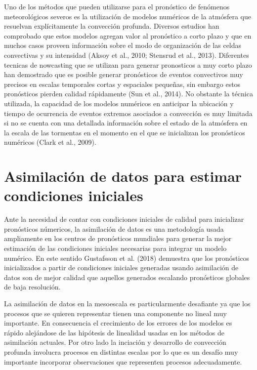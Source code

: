 \documentclass[12pt,oneside]{reedthesis}
\begin{document}
Uno de los métodos que pueden utilizarse para el pronóstico de fenómenos meteorológicos severos es la utilización de modelos numéricos de la atmósfera que resuelvan explícitamente la convección profunda. Diversos estudios han comprobado que estos modelos agregan valor al pronóstico a corto plazo y que en muchos casos proveen información sobre el modo de organización de las celdas convectivas y su intensidad (Aksoy et al., 2010; Stensrud et al., 2013). Diferentes tecnicas de nowcasting que se utilizan para generar pronosticos a muy corto plazo han demostrado que es posible generar pronósticos de eventos convectivos muy precisos en escalas temporales cortas y espaciales pequeñas, sin embargo estos pronósticos pierden calidad rápidamente (Sun et al., 2014). No obstante la técnica utilizada, la capacidad de los modelos numéricos en anticipar la ubicación y tiempo de ocurrencia de eventos extremos asociados a convección es muy limitada si no se cuenta con una detallada información sobre el estado de la atmósfera en la escala de las tormentas en el momento en el que se inicializan los pronósticos numéricos (Clark et al., 2009).

\hypertarget{asimilaciuxf3n-de-datos-para-estimar-condiciones-iniciales}{%
\section{Asimilación de datos para estimar condiciones iniciales}\label{asimilaciuxf3n-de-datos-para-estimar-condiciones-iniciales}}

Ante la necesidad de contar con condiciones iniciales de calidad para inicializar pronósticos númericos, la asimilación de datos es una metodología usada ampliamente en los centros de pronósticos mundiales para generar la mejor estimación de las condiciones iniciales necesarias para integrar un modelo numérico. En este sentido Gustafsson et al. (2018) demuestra que los pronósticos inicializados a partir de condiciones iniciales generadas usando asimilación de datos son de mejor calidad que aquellos generados escalando pronósticos globales de baja resolución.

La asimilación de datos en la mesoescala es particularmente desafiante ya que los procesos que se quieren representar tienen una componente no lineal muy importante. En consecuencia el crecimiento de los errores de los modelos es rápido alejándose de las hipótesis de linealidad usadas en los métodos de asimilación actuales. Por otro lado la inciación y desarrollo de convección profunda involucra procesos en distintas escalas por lo que es un desafío muy importante incorporar observaciones que representen procesos adecuadamente.
\end{document}
